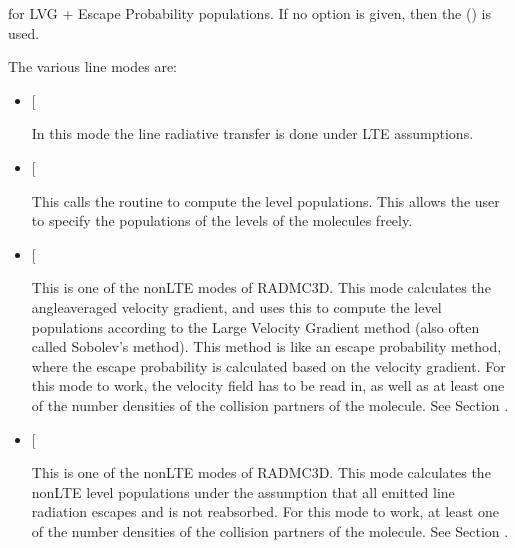 \documentclass[letterpaper,10pt,english]{sphinxmanual}
\begin{document}
for LVG + Escape Probability populations. If no option is given, then the 
() is used.

The various line modes are:
\begin{itemize}
\item {} 
 {[}\sphinxcode{\sphinxupquote{lines\_mode=1}}{]}

In this mode the line radiative transfer is done under LTE assumptions.

\item {} 
 {[}\sphinxcode{\sphinxupquote{lines\_mode=2}}{]}

This calls the routine  to compute
the level populations. This allows the user to specify the populations of
the levels of the molecules freely.

\item {} 
 {[}\sphinxcode{\sphinxupquote{lines\_mode=3}}{]}

This is one of the non\sphinxhyphen{}LTE modes of RADMC\sphinxhyphen{}3D. This mode calculates the
angle\sphinxhyphen{}averaged velocity gradient, and uses this to compute the level
populations according to the Large Velocity Gradient method (also often
called Sobolev’s method). This method is like an escape probability
method, where the escape probability is calculated based on the velocity
gradient. For this mode to work, the velocity field has to be read in, as
well as at least one of the number densities of the collision partners of
the molecule. See Section {\hyperref[\detokenize{lineradtrans:sec-lvg}]{}}.

\item {} 
 {[}\sphinxcode{\sphinxupquote{lines\_mode=4}}{]}

This is one of the non\sphinxhyphen{}LTE modes of RADMC\sphinxhyphen{}3D. This mode calculates the
non\sphinxhyphen{}LTE level populations under the assumption that all emitted line
radiation escapes and is not reabsorbed. For this mode to work, at least
one of the number densities of the collision partners of the molecule. See
Section {\hyperref[\detokenize{lineradtrans:sec-optthinpop}]{}}.


\end{itemize}
\end{document}
